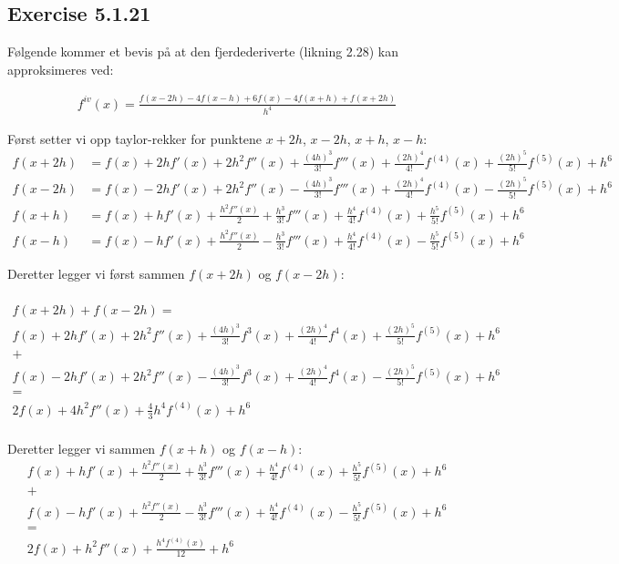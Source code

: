 \subsection{Exercise 5.1.21} 
\label{sec:exercise_5_1_21}

Følgende kommer et bevis på at den fjerdederiverte (likning 2.28) kan approksimeres ved: 

\begin{align}
    f^{iv}(x)=\frac{f(x-2h)-4f(x-h)+6f(x)-4f(x+h)+f(x+2h)}{h^4}\nonumber
\end{align}

Først setter vi opp taylor-rekker for punktene $x+2h$, $x-2h$, $x+h$, $x-h$: 
\begin{align}
    f(x+2h)&=f(x)+2hf'(x)+2h^2f''(x)+\frac{(4h)^3}{3!}f'''(x)+\frac{(2h)^4}{4!}f^{(4)}(x)+\frac{(2h)^5}{5!}f^{(5)}(x)+h^6\nonumber\\ 
    f(x-2h)&=f(x)-2hf'(x)+2h^2f''(x)-\frac{(4h)^3}{3!}f'''(x)+\frac{(2h)^4}{4!}f^{(4)}(x)-\frac{(2h)^5}{5!}f^{(5)}(x)+h^6\nonumber\\
    f(x+h)&=f(x)+hf'(x)+\frac{h^2f''(x)}{2}+\frac{h^3}{3!}f'''(x)+\frac{h^4}{4!}f^{(4)}(x)+\frac{h^5}{5!}f^{(5)}(x)+h^6\nonumber\\
    f(x-h)&=f(x)-hf'(x)+\frac{h^2f''(x)}{2}-\frac{h^3}{3!}f'''(x)+\frac{h^4}{4!}f^{(4)}(x)-\frac{h^5}{5!}f^{(5)}(x)+h^6\nonumber
\end{align}

Deretter legger vi først sammen $f(x+2h)$ og $f(x-2h)$: 

\begin{multline}
    \\
    f(x+2h)+f(x-2h)= \\
    f(x)+2hf'(x)+2h^2f''(x)+\frac{(4h)^3}{3!}f^3(x)+\frac{(2h)^4}{4!}f^{4}(x)+\frac{(2h)^5}{5!}f^{(5)}(x)+h^6 \\
    + \\
  	f(x)-2hf'(x)+2h^2f''(x)-\frac{(4h)^3}{3!}f^3(x)+\frac{(2h)^4}{4!}f^{4}(x)-\frac{(2h)^5}{5!}f^{(5)}(x)+h^6\nonumber \\
  	=\\
  	2f(x)+4h^2f''(x)+\frac{4}{3}h^4f^{(4)}(x)+h^6 \nonumber\\
\end{multline}

Deretter legger vi sammen $f(x+h)$ og $f(x-h)$: 
\begin{multline}
	f(x)+hf'(x)+\frac{h^2f''(x)}{2}+\frac{h^3}{3!}f'''(x)+\frac{h^4}{4!}f^{(4)}(x)+\frac{h^5}{5!}f^{(5)}(x)+h^6\\
	+\\
	f(x)-hf'(x)+\frac{h^2f''(x)}{2}-\frac{h^3}{3!}f'''(x)+\frac{h^4}{4!}f^{(4)}(x)-\frac{h^5}{5!}f^{(5)}(x)+h^6\\
	=\\
	2f(x)+h^2f''(x)+\frac{h^4f^{(4)}(x)}{12} + h^6 \nonumber \\
\end{multline}

